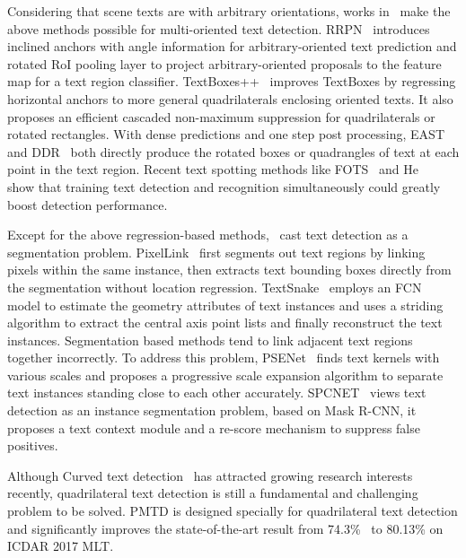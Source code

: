 \documentclass[10pt,twocolumn,letterpaper]{article}
\begin{document}
Considering that scene texts are with arbitrary orientations, works in~\cite{liao2018textboxes++,ma2018arbitrary,zhou2017east,he2017deep,liu2018fots,he2018end} make the above methods possible for multi-oriented text detection. RRPN~\cite{ma2018arbitrary} introduces inclined anchors with angle information for arbitrary-oriented text prediction and rotated RoI pooling layer to project arbitrary-oriented proposals to the feature map for a text region classifier. TextBoxes++~\cite{liao2018textboxes++} improves TextBoxes by regressing horizontal anchors to more general quadrilaterals enclosing oriented texts. It also proposes an efficient cascaded non-maximum suppression for quadrilaterals or rotated rectangles. With dense predictions and one step post processing, EAST~\cite{zhou2017east} and DDR~\cite{he2017deep} both directly produce the rotated boxes or quadrangles of text at each point in the text region. Recent text spotting methods like FOTS~\cite{liu2018fots} and He \etal~\cite{he2018end} show that training text detection and recognition simultaneously could greatly boost detection performance.

Except for the above regression-based methods,~\cite{deng2018pixellink,li2018shape,long2018textsnake,xie2018scene} cast text detection as a segmentation problem. PixelLink~\cite{deng2018pixellink} first segments out text regions by linking pixels within the same instance, then extracts text bounding boxes directly from the segmentation without location regression.
TextSnake~\cite{long2018textsnake} employs an FCN~\cite{long2015fully} model to estimate the geometry attributes of text instances and uses a striding algorithm to extract the central axis point lists and finally reconstruct the text instances.
Segmentation based methods tend to link adjacent text regions together incorrectly. To address this problem, PSENet~\cite{li2018shape} finds text kernels with various scales and proposes a progressive scale expansion algorithm to separate text instances standing close to each other accurately.
SPCNET~\cite{xie2018scene} views text detection as an instance segmentation problem, based on Mask R-CNN, it proposes a text context module and a re-score mechanism to suppress false positives.

Although Curved text detection~\cite{ch2017total, yuliang2017detecting} has attracted growing research interests recently, quadrilateral text detection is still a fundamental and challenging problem to be solved. PMTD is designed specially for quadrilateral text detection and significantly improves the state-of-the-art result from 74.3\%~\cite{huang2018mask} to 80.13\% on ICDAR 2017 MLT. 
\end{document}
